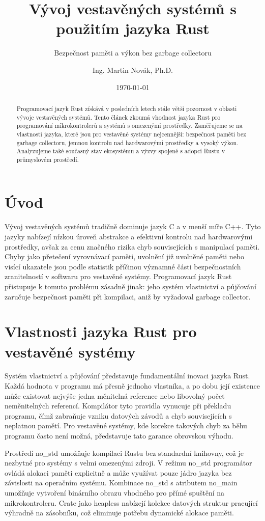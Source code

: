 \documentclass[
    language=czech,
    doctype=article,
]{../../omnilatex}
\title{Vývoj vestavěných systémů s použitím jazyka Rust}
\subtitle{Bezpečnost paměti a výkon bez garbage collectoru}
\author{Ing. Martin Novák, Ph.D.}
\date{\today}
\begin{document}
\maketitle

\begin{abstract}
Programovací jazyk Rust získává v posledních letech stále větší pozornost v oblasti vývoje vestavěných systémů. Tento článek zkoumá vhodnost jazyka Rust pro programování mikrokontrolerů a systémů s omezenými prostředky. Zaměřujeme se na vlastnosti jazyka, které jsou pro vestavěné systémy nejcennější: bezpečnost paměti bez garbage collectoru, jemnou kontrolu nad hardwarovými prostředky a vysoký výkon. Analyzujeme také současný stav ekosystému a výzvy spojené s adopcí Rustu v průmyslovém prostředí.
\end{abstract}

\section{Úvod}
Vývoj vestavěných systémů tradičně dominuje jazyk C a v menší míře C++. Tyto jazyky nabízejí nízkou úroveň abstrakce a efektivní kontrolu nad hardwarovými prostředky, avšak za cenu značného rizika chyb souvisejících s manipulací paměti. Chyby jako přetečení vyrovnávací paměti, uvolnění již uvolněné paměti nebo visící ukazatele jsou podle statistik příčinou významné části bezpečnostních zranitelností v softwaru pro vestavěné systémy. Programovací jazyk Rust přistupuje k tomuto problému zásadně jinak: jeho systém vlastnictví a půjčování zaručuje bezpečnost paměti při kompilaci, aniž by vyžadoval garbage collector.

\section{Vlastnosti jazyka Rust pro vestavěné systémy}
Systém vlastnictví a půjčování představuje fundamentální inovaci jazyka Rust. Každá hodnota v programu má přesně jednoho vlastníka, a po dobu její existence může existovat nejvýše jedna měnitelná reference nebo libovolný počet neměnitelných referencí. Kompilátor tyto pravidla vynucuje při překladu programu, čímž zabraňuje vzniku datových závodů a chyb souvisejících s neplatnou pamětí. Pro vestavěné systémy, kde korekce takových chyb za běhu programu často není možná, představuje tato garance obrovskou výhodu.

Prostředí no_std umožňuje kompilaci Rustu bez standardní knihovny, což je nezbytné pro systémy s velmi omezenými zdroji. V režimu no_std programátor ovládá alokaci paměti explicitně a může využívat pouze jádro jazyka bez závislosti na operačním systému. Kombinace no_std s atributem no_main umožňuje vytvoření binárního obrazu vhodného pro přímé spuštění na mikrokontroleru. Crate jako heapless nabízejí kolekce datových struktur pracující výhradně na zásobníku, což eliminuje potřebu dynamické alokace paměti.
\end{document}
